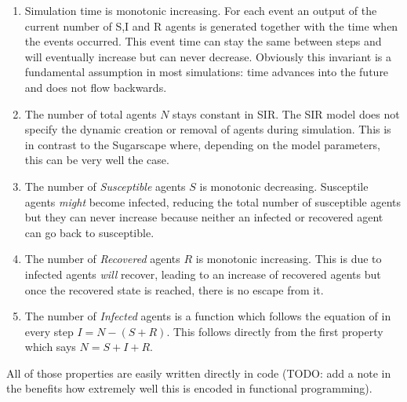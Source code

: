 \begin{enumerate}
	\item Simulation time is monotonic increasing. For each event an output of the current number of S,I and R agents is generated together with the time when the events occurred. This event time can stay the same between steps and will eventually increase but can never decrease. Obviously this invariant is a fundamental assumption in most simulations: time advances into the future and does not flow backwards.
	
	\item The number of total agents $N$ stays constant in SIR. The SIR model does not specify the dynamic creation or removal of agents during simulation. This is in contrast to the Sugarscape where, depending on the model parameters, this can be very well the case.
	
	\item The number of \textit{Susceptible} agents $S$ is monotonic decreasing. Susceptile agents \textit{might} become infected, reducing the total number of susceptible agents but they can never increase because neither an infected or recovered agent can go back to susceptible.
	
	\item The number of \textit{Recovered} agents $R$ is monotonic increasing. This is due to infected agents \textit{will} recover, leading to an increase of recovered agents but once the recovered state is reached, there is no escape from it.
	
	\item The number of \textit{Infected} agents is a function which follows the equation of in every step $I = N - (S + R)$. This follows directly from the first property which says $N = S + I + R$.
\end{enumerate}

All of those properties are easily written directly in code (TODO: add a note in the benefits how extremely well this is encoded in functional programming).

